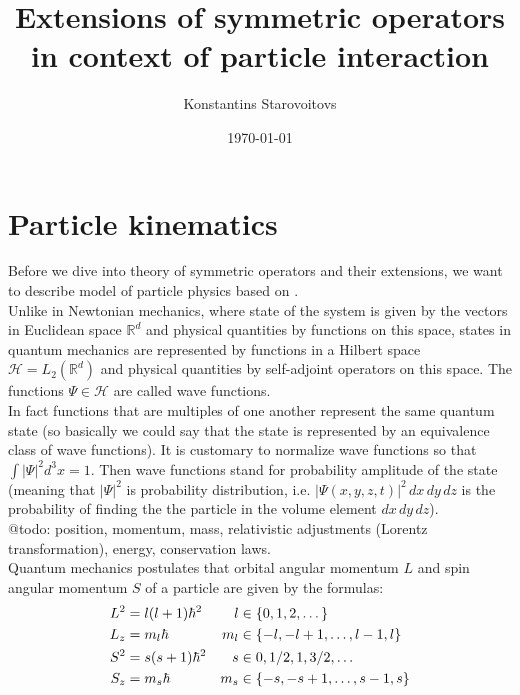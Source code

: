\documentclass[11pt, a4paper, german]{article}
\author{Konstantins Starovoitovs}
\date{\today}
\title{Extensions of symmetric operators in context of particle interaction}
\theoremstyle{plain}
\theoremstyle{definition}
\theoremstyle{remark}
\numberwithin{equation}{section}
\numberwithin{theorem}{section}
\begin{document}
\maketitle


\section{Particle kinematics}

Before we dive into theory of symmetric operators and their extensions, we want to describe model of particle physics based on \cite{griffiths}.\\

Unlike in Newtonian mechanics, where state of the system is given by the vectors in Euclidean space $\mathbb{R} ^d$ and physical quantities by functions on this space, states in quantum mechanics are represented by functions in a Hilbert space $\mathcal{H} = L_2(\mathbb{R} ^d)$ and physical quantities by self-adjoint operators on this space. The functions $\Psi \in \mathcal{H}$ are called wave functions.\\

In fact functions that are multiples of one another represent the same quantum state (so basically we could say that the state is represented by an equivalence class of wave functions). It is customary to normalize wave functions so that $\int |\Psi|^2 d^3x=1$. Then wave functions stand for probability amplitude of the state (meaning that $|\Psi |^2$ is probability distribution, i.e. $|\Psi(x,y,z,t)|^2 \, dx \, dy\,dz$ is the probability of finding the the particle in the volume element $dx\,dy\,dz$).\\

@todo: position, momentum, mass, relativistic adjustments (Lorentz transformation), energy, conservation laws.\\

Quantum mechanics postulates that orbital angular momentum $L$ and spin angular momentum $S$ of a particle are given by the formulas:
\begin{align}
L^2 &= l(l+1)\hbar^2 &l   &\in \mathbb \{0, 1, 2, \dots\} \label{eq:l2} \\
L_z &= m_l\hbar      &m_l &\in \{-l, -l+1, \dots, l-1, l\} \label{eq:lz}\\
S^2 &= s(s+1)\hbar^2 &s   &\in {0, 1/2, 1, 3/2, \dots} \label{eq:s2}\\
S_z &= m_s\hbar      &m_s &\in \{-s, -s+1, \dots, s-1, s\} \label{eq:sz}
\end{align}
\end{document}
